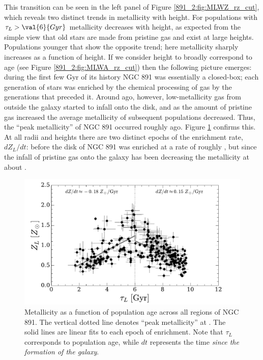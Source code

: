 This transition can be seen in the left panel of Figure
\ref{891_2:fig:MLWZ_rz_cut}, which reveals two distinct trends in
metallicity with height. For populations with $\tau_L > \val{6}{Gyr}$
metallicity decreases with height, as expected from the simple view
that old stars are made from pristine gas and exist at large
heights. Populations younger that  show the opposite
trend; here metallicity sharply increases as a function of height. If
we consider height to broadly correspond to age (see Figure
\ref{891_2:fig:MLWA_rz_cut}) then the following picture emerges:
during the first few Gyr of its history NGC 891 was essentially a
closed-box; each generation of stars was enriched by the chemical
processing of gas by the generations that preceded it. Around
 ago, however, low-metallicity gas from outside the galaxy
started to infall onto the disk, and as the amount of pristine gas
increased the average metallicity of subsequent populations
decreased. Thus, the ``peak metallicity'' of NGC 891 occurred roughly
 ago. Figure \ref{891_2:fig:tau_Z} confirms this. At all
radii and heights there are two distinct epochs of the enrichment
rate, $dZ_L/dt$: before  the disk of NGC 891 was enriched
at a rate of roughly , but since  the
infall of pristine gas onto the galaxy has been decreasing the
metallicity at about .

\begin{figure}
  \centering
  \includegraphics[width=\textwidth]{891_2/figs/tau_Z.pdf}
  \caption[Enrichment history in NGC
  891]{\fixspacing\label{891_2:fig:tau_Z}Metallicity as a function of
    population age across all regions of NGC 891. The vertical dotted
    line denotes ``peak metallicity'' at . The solid lines
    are linear fits to each epoch of enrichment. Note that $\tau_L$
    corresponds to population age, while $dt$ represents the time
    \emph{since the formation of the galaxy}.}
\end{figure}

